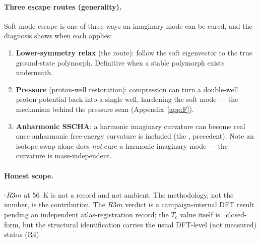 \paragraph{Three escape routes (generality).}
Soft-mode escape is one of three ways an imaginary mode can be cured, and the
 diagnosis shows when each applies:
\begin{enumerate}\itemsep0.2em
\item \textbf{Lower-symmetry relax} (the  route): follow the soft
  eigenvector to the true ground-state polymorph. Definitive when a stable
  polymorph exists underneath.
\item \textbf{Pressure} (proton-well restoration): compression can turn a
  double-well proton potential back into a single well, hardening the soft
  mode --- the mechanism behind the  pressure scan
  (Appendix~\ref{app:F}).
\item \textbf{Anharmonic SSCHA}: a harmonic imaginary curvature can become
  real once anharmonic free-energy curvature is included (the ,
   precedent). Note an isotope swap alone does \emph{not} cure a
  harmonic imaginary mode --- the curvature is mass-independent.
\end{enumerate}

\paragraph{Honest scope.}
-$R3m$ at \SI{56}{\kelvin} is not a record and not ambient. The
methodology, not the number, is the contribution. The $R3m$ verdict is a
campaign-internal DFT result pending an independent atlas-registration
record; the $T_c$ value itself is \tierGreen\ closed-form, but the structural
identification carries the usual DFT-level (not measured) status (R4).
